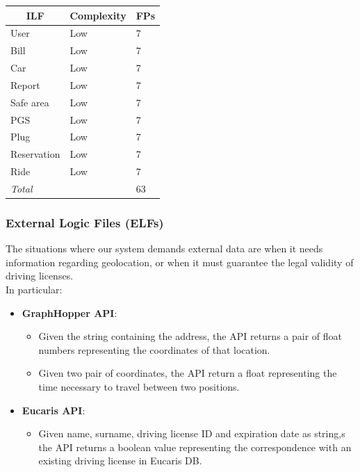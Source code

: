 \documentclass[english]{article}
\begin{document}
\begin{center}
	\begin{tabular}{ |p{8cm}|m{2cm}|p{1cm}| }
		\hline
		\multicolumn{1}{|c|}{\textbf{ILF}} & \multicolumn{1}{c|}{\textbf{Complexity}} & \multicolumn{1}{c|}{\textbf{FPs}} \\
		\hline
		User & Low & 7 \\
		\hline
		Bill & Low & 7\\
		\hline
		Car & Low & 7\\
		\hline
		Report & Low & 7\\
		\hline
		Safe area & Low & 7\\
		\hline
		PGS & Low & 7\\
		\hline
		Plug & Low & 7\\
		\hline
		Reservation & Low & 7\\
		\hline
		Ride & Low & 7\\
		\hline
		\multicolumn{2}{|l|}{\textit{Total}} & \multicolumn{1}{l|}{63} \\
		\hline
	\end{tabular}
\end{center}

\paragraph{}

\subsubsection{External Logic Files (ELFs)}

The situations where our system demands external data are when it needs information regarding geolocation, or when it must guarantee the legal validity of driving licenses.\\
In particular:

\begin{itemize}
	\item \textbf{GraphHopper API}:
		\begin{itemize}
			\item{Given the string containing the address, the API returns a pair of float numbers representing the coordinates of that location.}
			\item{Given two pair of coordinates, the API return a float representing the time necessary to travel between two positions.}
		\end{itemize}
	\item \textbf{Eucaris API}:
		\begin{itemize}
			\item{Given name, surname, driving license ID and expiration date as string,s the API returns a boolean value representing the correspondence with an existing driving license in Eucaris DB.}
		\end{itemize}
\end{itemize}
\end{document}
